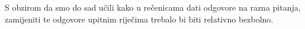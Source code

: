
\author{Tomislav Mamić}

	
	S obzirom da smo do sad učili kako u rečenicama dati odgovore na razna pitanja, zamijeniti te odgovore upitnim riječima trebalo bi biti relativno bezbolno.
